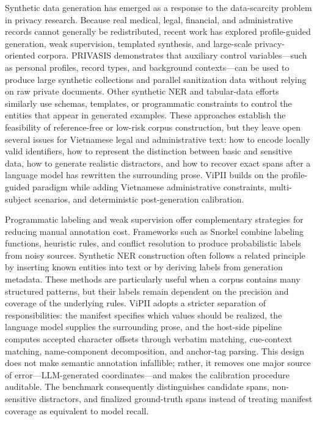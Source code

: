 \documentclass[
]{article}
\begin{document}
Synthetic data generation has emerged as a response to the data-scarcity
problem in privacy research. Because real medical, legal, financial, and
administrative records cannot generally be redistributed, recent work
has explored profile-guided generation, weak supervision, templated
synthesis, and large-scale privacy-oriented corpora. PRIVASIS
demonstrates that auxiliary control variables---such as personal
profiles, record types, and background contexts---can be used to produce
large synthetic collections and parallel sanitization data without
relying on raw private documents. Other synthetic NER and tabular-data
efforts similarly use schemas, templates, or programmatic constraints to
control the entities that appear in generated examples. These approaches
establish the feasibility of reference-free or low-risk corpus
construction, but they leave open several issues for Vietnamese legal
and administrative text: how to encode locally valid identifiers, how to
represent the distinction between basic and sensitive data, how to
generate realistic distractors, and how to recover exact spans after a
language model has rewritten the surrounding prose. ViPII builds on the
profile-guided paradigm while adding Vietnamese administrative
constraints, multi-subject scenarios, and deterministic post-generation
calibration.

Programmatic labeling and weak supervision offer complementary
strategies for reducing manual annotation cost. Frameworks such as
Snorkel combine labeling functions, heuristic rules, and conflict
resolution to produce probabilistic labels from noisy sources. Synthetic
NER construction often follows a related principle by inserting known
entities into text or by deriving labels from generation metadata. These
methods are particularly useful when a corpus contains many structured
patterns, but their labels remain dependent on the precision and
coverage of the underlying rules. ViPII adopts a stricter separation of
responsibilities: the manifest specifies which values should be
realized, the language model supplies the surrounding prose, and the
host-side pipeline computes accepted character offsets through verbatim
matching, cue-context matching, name-component decomposition, and
anchor-tag parsing. This design does not make semantic annotation
infallible; rather, it removes one major source of error---LLM-generated
coordinates---and makes the calibration procedure auditable. The
benchmark consequently distinguishes candidate spans, non-sensitive
distractors, and finalized ground-truth spans instead of treating
manifest coverage as equivalent to model recall.
\end{document}
